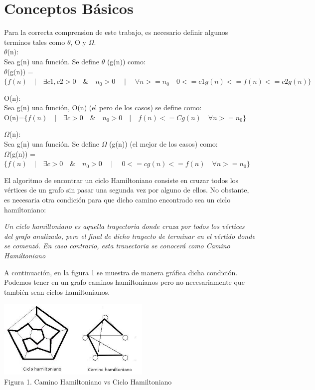 \documentclass[spanish]{article}
\begin{document}
	\section{Conceptos B\'asicos}
	Para la correcta comprension de este trabajo, es necesario definir algunos terminos tales como $\theta$, O y $\Omega$.\\
	 $\theta$(n):\\
		Sea g(n) una función. Se define  $\theta$ (g(n)) como:\\
		
		 	$\theta$(g(n)) = $\{ f(n) \quad | \quad \exists c1,c2>0 \quad \& \quad n_{0}>0 \quad \mid \quad \forall n>=n_{0} \quad 0<= c1g(n) <= f(n) <= c2g(n) \}$
	\bigskip		 	
		 	
	O(n):\\
		Sea  g(n)  una función, O(n) (el pero de los casos) se define como:\\
		
			\hspace{1cm}O(n)=$\{f(n) \quad | \quad \exists c >0 \quad \& \quad n_{0}>0 \quad | \quad f(n) <= Cg(n) \quad \forall  n>= n_{0} \}$
	\bigskip
	
	$\Omega$(n):\\
	Sea  g(n)  una función. Se define $\Omega$ (g(n)) (el mejor de los casos) como:\\

		\hspace{1cm}$\Omega$(g(n)) =$\{f(n) \quad | \quad \exists c >0 \quad \& \quad n_{0}>0 \quad \mid \quad  0<= cg(n)<= f(n) \quad \forall n>= n_{0} \}$
	\bigskip
	
	El algoritmo de encontrar un ciclo Hamiltoniano consiste en cruzar todos los vértices de un grafo sin pasar una segunda vez por alguno de ellos. No obstante, es necesaria otra condición para que dicho camino encontrado sea un ciclo hamiltoniano:

	\begin{center}
		\textit{Un ciclo hamiltoniano es aquella trayectoria donde cruza por todos los vértices del grafo analizado, pero el final de dicho trayecto de terminar en el vértido donde se comenzó. En caso contrario, esta trauectoria se conocerá como Camino Hamiltoniano}
	\end{center}

	A continuación, en la figura 1 se muestra de manera gráfica dicha condición. Podemos tener en un grafo caminos hamiltonianos pero no necesariamente que también sean ciclos hamiltonianos.

	\begin{center}
		\includegraphics[width=0.55\textwidth]{./imagenes/figura1.png}\\
		Figura 1. Camino Hamiltoniano vs Ciclo Hamiltoniano\\
	\end{center}
\end{document}
